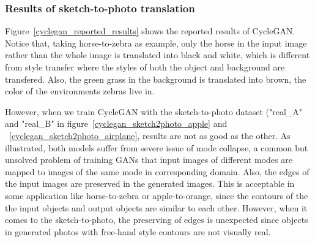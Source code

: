 \subsubsection{Results of sketch-to-photo translation}
Figure~\ref{cyclegan_reported_results} shows the reported results of CycleGAN. Notice that, taking horse-to-zebra as example, only the horse in the input image rather than the whole image is translated into black and white, which is different from style transfer where the styles of both the object and background are transfered. Also, the green grass in the background is translated into brown, the color of the environments zebras live in.

However, when we train CycleGAN with the sketch-to-photo dataset ("real\_A" and "real\_B" in figure~\ref{cyclegan_sketch2photo_apple} and ~\ref{cyclegan_sketch2photo_airplane}, results are not as good as the other. As illustrated, both models suffer from severe issue of mode collapse, a common but unsolved problem of training GANs that input images of different modes are mapped to images of the same mode in corresponding domain. Also, the edges of the input images are preserved in the generated images. This is acceptable in some application like horse-to-zebra or apple-to-orange, since the contours of the the input objects and output objects are similar to each other. However, when it comes to the sketch-to-photo, the preserving of edges is unexpected since objects in generated photos with free-hand style contours are not visually real.

